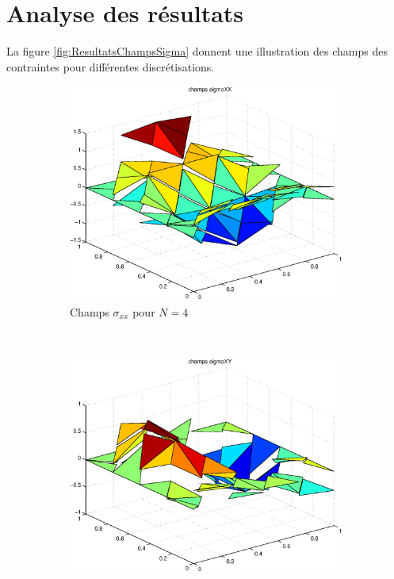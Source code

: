 \section{Analyse des résultats}
La figure \ref{fig:ResultatsChampsSigma} donnent une illustration des champs des contraintes pour différentes discrétisations.

 

\begin{figure}[h!]
  \centering
  \begin{subfigure}[b]{0.32\textwidth}
  \includegraphics[width=\textwidth]{images/sigmaxxN4.eps}
  \caption{Champs $\sigma_{xx}$ pour $N=4$}
  \end{subfigure}%
  ~
  \begin{subfigure}[b]{0.32\textwidth}
  \includegraphics[width=\textwidth]{images/sigmaxyN4.eps}

\end{subfigure}
\end{figure}
